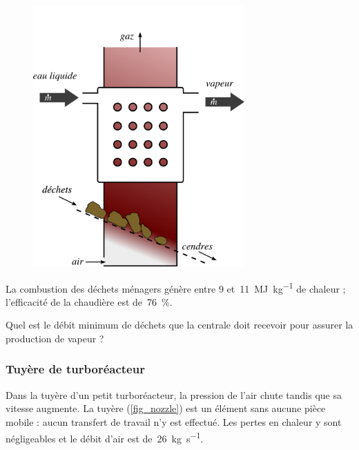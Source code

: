 	\begin{figure}
		\begin{center}
			\includegraphics[height=10cm, max width=0.9\columnwidth]{images/boiler.png}
		\end{center}
		\label{fig_boiler}
	\end{figure}
	
	La combustion des déchets ménagers génère entre \num{9} et~\SI{11}{\mega\joule\per\kilogram} de chaleur ; l’efficacité de la chaudière est de~\SI{76}{\percent}.
	
	Quel est le débit minimum de déchets que la centrale doit recevoir pour assurer la production de vapeur ?
	

\subsubsection{Tuyère de turboréacteur}
\label{exo_tuyere_turboreacteur}

	Dans la tuyère d’un petit turboréacteur, la pression de l’air chute tandis que sa vitesse augmente. La tuyère (\cref{fig_nozzle}) est un élément sans aucune pièce mobile : aucun transfert de travail n’y est effectué. Les pertes en chaleur y sont négligeables et le débit d’air est de~\SI{26}{\kilogram\per\second}.

